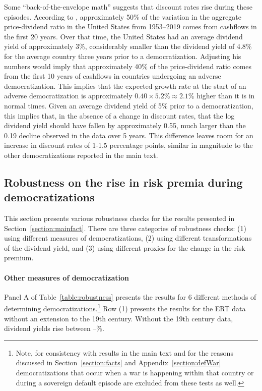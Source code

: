 Some ``back-of-the-envelope math'' suggests that discount rates rise during these episodes. According to \cite{Goncalves2022}, approximately 50\% of the variation in the aggregate price-dividend ratio in the United States from 1953--2019 comes from cashflows in the first 20 years. Over that time, the United States had an average dividend yield of approximately 3\%, considerably smaller than the dividend yield of 4.8\% for the average country three years prior to a democratization. Adjusting his numbers would imply that approximately 40\% of the price-dividend ratio comes from the first 10 years of cashflows in countries undergoing an adverse democratization. This implies that the expected growth rate at the start of an adverse democratization is approximately $0.40 \times 5.2\% \approx 2.1\%$ higher than it is in normal times. Given an average dividend yield of 5\% prior to a democratization, this implies that, in the absence of a change in discount rates, that the log dividend yield should have fallen by approximately 0.55, much larger than the 0.19 decline observed in the data over 5 years. This difference leaves room for an increase in discount rates of 1-1.5 percentage points,  similar in magnitude to the other democratizations reported in the main text.

\subsection{Robustness on the rise in risk premia during democratizations}\label{section:robustness}

This section presents various robustness checks for the results presented in Section~\ref{section:mainfact}. There are three categories of robustness checks: (1) using different measures of democratizations, (2) using different transformations of the dividend yield, and (3) using different proxies for the change in the risk premium.

\paragraph{Other measures of democratization}
Panel A of Table~\ref{table:robustness} presents the results for 6 different methods of determining democratizations.\footnote{Note, for consistency with results in the main text and for the reasons discussed in Section~\ref{section:facts} and Appendix~\ref{section:defWar} democratizations that occur when a war is happening within that country or during a sovereign default episode are excluded from these tests as well.} Row (1) presents the results for the ERT data without an extension to the 19th century. Without the 19th century data, dividend yields rise between \tabBThreeERTOnlyLow\---\tabBThreeERTOnlyHigh\%. 

